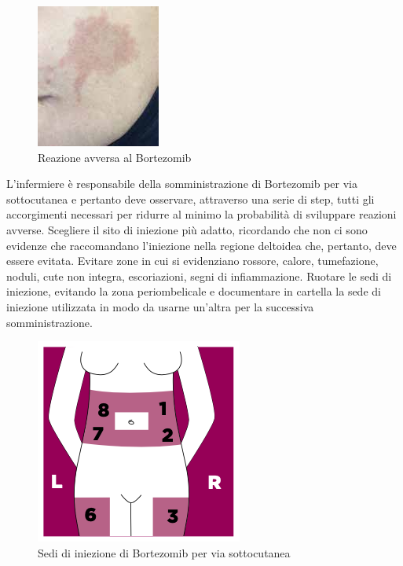 \begin{figure}[H]
    \begin{center}
    \includegraphics[width=0.3\columnwidth]{img/bortezomibreaction2.jpeg}
    \end{center}
    \caption[ Reazione avversa al Bortezomib]{ Reazione avversa al Bortezomib
    \cite{img31}}

\end{figure}

L’infermiere è responsabile della somministrazione di Bortezomib per via sottocutanea e pertanto deve osservare,
attraverso una serie di step, tutti gli accorgimenti necessari per ridurre al minimo la probabilità di sviluppare 
reazioni avverse. 
Scegliere il sito di iniezione più adatto, ricordando che non ci sono evidenze che raccomandano l’iniezione 
nella regione deltoidea che, pertanto, deve essere evitata. Evitare zone in cui si evidenziano rossore, calore, 
tumefazione, noduli, cute non integra, escoriazioni, segni di infiammazione. Ruotare le sedi di iniezione, evitando 
la zona periombelicale e documentare in cartella la sede di iniezione utilizzata in modo da usarne 
un’altra per la successiva somministrazione\cite{BORTNURSES}.\\

\begin{figure}[H]
    \begin{center}
    \includegraphics[width=0.4\columnwidth]{img/SEDI.png}
    \end{center}
    \caption[ Sedi di iniezione di Bortezomib per via sottocutanea]{ Sedi di iniezione di Bortezomib per via sottocutanea
    \cite{img32}}

\end{figure}

